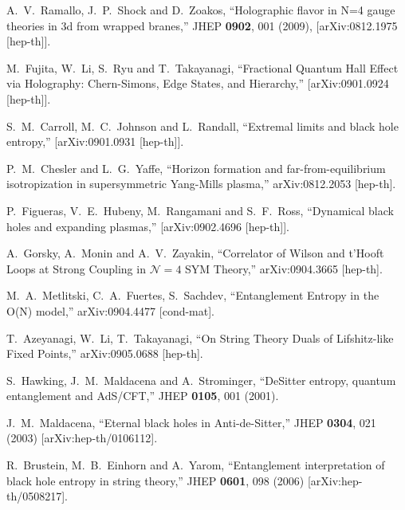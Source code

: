 \documentclass[12pt]{article}
\begin{document}
\begin{thebibliography}{99}
  A.~V.~Ramallo, J.~P.~Shock and D.~Zoakos,
  ``Holographic flavor in N=4 gauge theories in 3d from wrapped branes,''
  JHEP {\bf 0902}, 001 (2009),
  [arXiv:0812.1975 [hep-th]].

  M.~Fujita, W.~Li, S.~Ryu and T.~Takayanagi,
  ``Fractional Quantum Hall Effect via Holography: Chern-Simons, Edge States,
  and Hierarchy,''
  [arXiv:0901.0924 [hep-th]].

  S.~M.~Carroll, M.~C.~Johnson and L.~Randall,
  ``Extremal limits and black hole entropy,''
  [arXiv:0901.0931 [hep-th]].

  P.~M.~Chesler and L.~G.~Yaffe,
  ``Horizon formation and far-from-equilibrium isotropization in supersymmetric
  Yang-Mills plasma,''
  arXiv:0812.2053 [hep-th].

  P.~Figueras, V.~E.~Hubeny, M.~Rangamani and S.~F.~Ross,
  ``Dynamical black holes and expanding plasmas,''
  [arXiv:0902.4696 [hep-th]].

  A.~Gorsky, A.~Monin and A.~V.~Zayakin,
  ``Correlator of Wilson and t'Hooft Loops at Strong Coupling in
  $\mathcal{N}=4$ SYM Theory,''
  arXiv:0904.3665 [hep-th].

 M.~A.~Metlitski, C.~A.~Fuertes, S.~Sachdev,
 ``Entanglement Entropy in the O(N) model,''
arXiv:0904.4477 [cond-mat].

 T.~Azeyanagi, W.~Li, T.~Takayanagi,
 ``On String Theory Duals of Lifshitz-like Fixed Points,''
arXiv:0905.0688 [hep-th].




S.~Hawking, J.~M.~Maldacena and A.~Strominger,
``DeSitter entropy,
quantum entanglement and AdS/CFT,''
 JHEP {\bf 0105}, 001 (2001).

J.~M.~Maldacena,
  ``Eternal black holes in Anti-de-Sitter,''
JHEP {\bf 0304}, 021 (2003)
  [arXiv:hep-th/0106112].


  R.~Brustein, M.~B.~Einhorn and A.~Yarom,
  ``Entanglement interpretation of black hole entropy in string theory,''
  JHEP {\bf 0601}, 098 (2006)
  [arXiv:hep-th/0508217].


\end{thebibliography}
\end{document}
